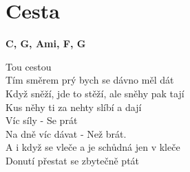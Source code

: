 \section{Cesta}
\onehalfspacing

\textbf{C, G, Ami, F, G}

Tou  cestou\\
Tím směrem prý bych se  dávno měl dát \\
Když  sněží, jde to stěží, ale sněhy pak tají \\
Kus  něhy ti za nehty  slíbí a dají\\

Víc  síly - Se prát\\
Na dně víc  dávat - Než brát.\\
A  i když se vleče a je schůdná jen v kleče\\
Donutí  přestat se zbytečně  ptát\\

